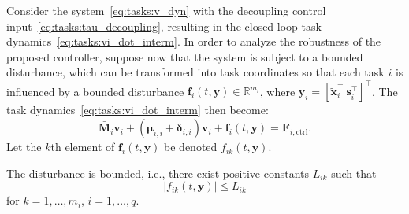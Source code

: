 \documentclass[../main.tex]{subfiles}
\begin{document}
Consider the system~\eqref{eq:tasks:v_dyn} with the decoupling control input~\eqref{eq:tasks:tau_decoupling}, resulting in the closed-loop task dynamics~\eqref{eq:tasks:vi_dot_interm}. In order to analyze the robustness of the proposed controller, suppose now that the system is subject to a bounded disturbance, which can be transformed into task coordinates so that each task $i$ is influenced by a bounded disturbance $\bm{f}_i(t,\bm{y}) \in \mathbb{R}^{m_i}$, where $\bm{y}_i = \left[ \tilde{\bm{x}}_i^\top \ \bm{s}_i^\top \right]^\top$. The task dynamics~\eqref{eq:tasks:vi_dot_interm} then become:
\begin{equation}\label{eq:comp:vi_dot_interm_dist}
    \bar{\bm{M}}_i \dot{\bm{v}}_i + \left( \bm{\mu}_{i,i} + \bm{\delta}_{i,i} \right) \bm{v}_i + \bm{f}_i(t,\bm{y})= \bm{F}_{i,\textrm{ctrl}} .
\end{equation}
%
Let the $k$th element of $\bm{f}_i(t,\bm{y})$ be denoted $f_{ik}(t,\bm{y})$.
\begin{assumption}\label{ass:comp:fi_bounded}
    The disturbance is bounded, i.e., there exist positive constants $L_{ik}$ such that
    \begin{equation}
        | f_{ik}(t,\bm{y}) | \leq L_{ik}
    \end{equation}
    for $k=1,\ldots,m_i$, $i=1,\ldots,q$.
\end{assumption}
\end{document}
